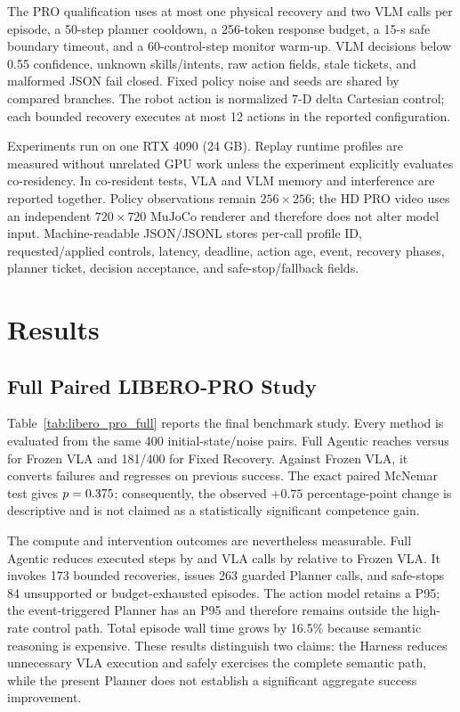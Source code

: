 \documentclass[runningheads]{waica}
\begin{document}
The PRO qualification uses at most one physical recovery and two VLM calls per
episode, a 50-step planner cooldown, a 256-token response budget, a 15-s safe
boundary timeout, and a 60-control-step monitor warm-up. VLM decisions below
0.55 confidence, unknown skills/intents, raw action fields, stale tickets, and
malformed JSON fail closed. Fixed policy noise and seeds are shared by compared
branches. The robot action is normalized 7-D delta Cartesian control; each
bounded recovery executes at most 12 actions in the reported configuration.

Experiments run on one RTX 4090 (24 GB). Replay runtime profiles are measured
without unrelated GPU work unless the experiment explicitly evaluates
co-residency. In co-resident tests, VLA and VLM memory and interference are
reported together. Policy observations remain $256\!\times\!256$; the HD PRO
video uses an independent $720\!\times\!720$ MuJoCo renderer and therefore does
not alter model input. Machine-readable JSON/JSONL stores per-call profile ID,
requested/applied controls, latency, deadline, action age, event, recovery
phases, planner ticket, decision acceptance, and safe-stop/fallback fields.

\section{Results}
\label{sec:results}

\subsection{Full Paired LIBERO-PRO Study}

Table~\ref{tab:libero_pro_full} reports the final benchmark study. Every method
is evaluated from the same 400 initial-state/noise pairs. Full Agentic reaches
\CarveFullAgenticSuccess{} versus \CarveFullFrozenSuccess{} for Frozen VLA and
181/400 for Fixed Recovery. Against Frozen VLA, it converts
\CarveFullConversions{} failures and regresses on \CarveFullRegressions{}
previous success. The exact paired McNemar test gives
$p=0.375$; consequently, the observed $+0.75$ percentage-point
change is descriptive and is not claimed as a statistically significant
competence gain.



The compute and intervention outcomes are nevertheless measurable. Full
Agentic reduces executed steps by \CarveFullStepReduction{} and VLA calls by
\CarveFullCallReduction{} relative to Frozen VLA. It invokes 173 bounded
recoveries, issues 263 guarded Planner calls, and safe-stops 84 unsupported or
budget-exhausted episodes. The action model retains a
\CarveFullVlaPninetyfive{} P95; the event-triggered Planner has an
\CarveFullPlannerPninetyfive{} P95 and therefore remains outside the high-rate
control path. Total episode wall time grows by 16.5\% because semantic
reasoning is expensive. These results distinguish two claims: the Harness
reduces unnecessary VLA execution and safely exercises the complete semantic
path, while the present Planner does not establish a significant aggregate
success improvement.
\end{document}
